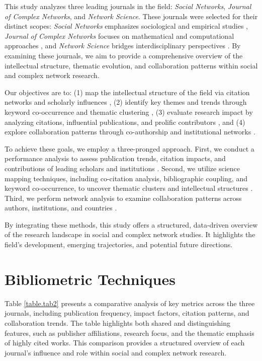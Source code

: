 \documentclass[twocolumn]{article}
\begin{document}
	This study analyzes three leading journals in the field: \textit{Social Networks}, \textit{Journal of Complex Networks}, and \textit{Network Science}. These journals were selected for their distinct scopes: \textit{Social Networks} emphasizes sociological and empirical studies \cite{wasserman1994social}, \textit{Journal of Complex Networks} focuses on mathematical and computational approaches \cite{boccaletti2006complex}, and \textit{Network Science} bridges interdisciplinary perspectives \cite{newman2010networks}. By examining these journals, we aim to provide a comprehensive overview of the intellectual structure, thematic evolution, and collaboration patterns within social and complex network research.
	
	Our objectives are to: (1) map the intellectual structure of the field via citation networks and scholarly influences \cite{small1973co}, (2) identify key themes and trends through keyword co-occurrence and thematic clustering \cite{callon1983co}, (3) evaluate research impact by analyzing citations, influential publications, and prolific contributors \cite{garfield1979citation}, and (4) explore collaboration patterns through co-authorship and institutional networks \cite{glanzel2004coauthorship}.
	
	To achieve these goals, we employ a three-pronged approach. First, we conduct a performance analysis to assess publication trends, citation impacts, and contributions of leading scholars and institutions \cite{bornmann2011citation}. Second, we utilize science mapping techniques, including co-citation analysis, bibliographic coupling, and keyword co-occurrence, to uncover thematic clusters and intellectual structures \cite{van2010visualizing,chen2017citespace}. Third, we perform network analysis to examine collaboration patterns across authors, institutions, and countries \cite{newman2004coauthorship, moody2004sociology}.
	
	By integrating these methods, this study offers a structured, data-driven overview of the research landscape in social and complex network studies. It highlights the field's development, emerging trajectories, and potential future directions.
	
	
	
	
	\section{Bibliometric Techniques}\label{Bibliometric Techniques}
	
	Table \ref{table.tab2} presents a comparative analysis of key metrics across the three journals, including publication frequency, impact factors, citation patterns, and collaboration trends\cite{donthu2021bibliometric}. The table highlights both shared and distinguishing features, such as publisher affiliations, research focus, and the thematic emphasis of highly cited works. This comparison provides a structured overview of each journal’s influence and role within social and complex network research\cite{ WOS:000356343600002}.
	
\end{document}
